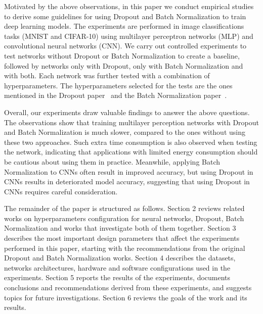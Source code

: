 \documentclass[../dropout-vs-batch-normalization.tex]{subfiles}
\begin{document}
Motivated by the above observations, in this paper we conduct empirical studies to derive some guidelines for using Dropout and Batch Normalization to train deep learning models. The experiments are performed in image classifications tasks (MNIST and CIFAR-10) using multilayer perceptron networks (MLP) and convolutional neural networks (CNN). We carry out controlled experiments to test networks without Dropout or Batch Normalization to create a baseline, followed by networks only with Dropout, only with Batch Normalization and with both. Each network was further tested with a combination of hyperparameters. The hyperparameters selected for the tests are the ones mentioned in the Dropout paper~\cite{Srivastava2014} and the Batch Normalization paper~\cite{Ioffe2015}.

Overall, our experiments draw valuable findings to answer the above questions. The observations show that training multilayer perception networks with Dropout and Batch Normalization is much slower, compared to the ones without using these two approaches. Such extra time consumption is also observed when testing the network, indicating that applications with limited energy consumption should be cautious about using them in practice. Meanwhile, applying Batch Normalization to CNNs often result in improved accuracy, but using Dropout in CNNs results in deteriorated model accuracy, suggesting that using Dropout in CNNs requires careful consideration.

The remainder of the paper is structured as follows. Section 2 reviews related works on hyperparameters configuration for neural networks, Dropout, Batch Normalization and works that investigate both of them together. Section 3 describes the most important design parameters that affect the experiments performed in this paper, starting with the recommendations from the original Dropout and Batch Normalization works. Section 4 describes the datasets, networks architectures, hardware and software configurations used in the experiments. Section 5 reports the results of the experiments, documents conclusions and recommendations derived from these experiments, and suggests topics for future investigations. Section 6 reviews the goals of the work and its results. 
\end{document}
